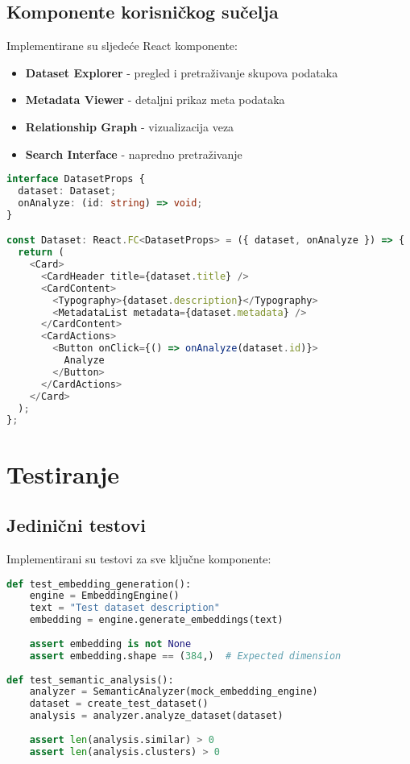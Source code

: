 \subsection{Komponente korisničkog sučelja}
Implementirane su sljedeće React komponente:
\begin{itemize}
    \item \textbf{Dataset Explorer} - pregled i pretraživanje skupova podataka
    \item \textbf{Metadata Viewer} - detaljni prikaz meta podataka
    \item \textbf{Relationship Graph} - vizualizacija veza
    \item \textbf{Search Interface} - napredno pretraživanje
\end{itemize}

\begin{lstlisting}[language=TypeScript, caption=Implementacija Dataset komponente]
interface DatasetProps {
  dataset: Dataset;
  onAnalyze: (id: string) => void;
}

const Dataset: React.FC<DatasetProps> = ({ dataset, onAnalyze }) => {
  return (
    <Card>
      <CardHeader title={dataset.title} />
      <CardContent>
        <Typography>{dataset.description}</Typography>
        <MetadataList metadata={dataset.metadata} />
      </CardContent>
      <CardActions>
        <Button onClick={() => onAnalyze(dataset.id)}>
          Analyze
        </Button>
      </CardActions>
    </Card>
  );
};
\end{lstlisting}

\section{Testiranje}
\label{sec:testing}

\subsection{Jedinični testovi}
Implementirani su testovi za sve ključne komponente:

\begin{lstlisting}[language=Python, caption=Primjer unit testa]
def test_embedding_generation():
    engine = EmbeddingEngine()
    text = "Test dataset description"
    embedding = engine.generate_embeddings(text)
    
    assert embedding is not None
    assert embedding.shape == (384,)  # Expected dimension
    
def test_semantic_analysis():
    analyzer = SemanticAnalyzer(mock_embedding_engine)
    dataset = create_test_dataset()
    analysis = analyzer.analyze_dataset(dataset)
    
    assert len(analysis.similar) > 0
    assert len(analysis.clusters) > 0
\end{lstlisting}

